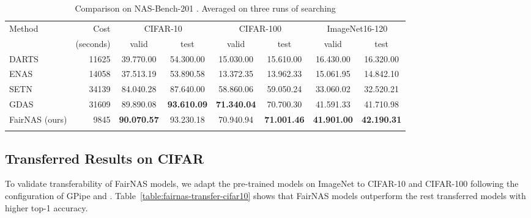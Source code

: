 \documentclass[10pt,twocolumn,letterpaper]{article}
\theoremstyle{definition}
\begin{document}
\begin{table*}[ht]
	\small
	\setlength{\tabcolsep}{2pt}
	\centering
\begin{tabular}{|l|r|*{6}{c|}}
\hline
Method	& Cost  & \multicolumn{2}{c|}{CIFAR-10}  & \multicolumn{2}{c|}{CIFAR-100}   &  \multicolumn{2}{c|}{ImageNet16-120}  \\
\cline{3-8}
  & (seconds) & valid & test & valid & test & valid & test \\
\hline
DARTS \cite{liu2018darts} & 11625& 39.770.00 & 54.300.00 & 15.030.00 & 15.610.00 & 16.430.00 & 16.320.00 \\
ENAS \cite{pham2018efficient} & 14058 & 37.513.19 & 53.890.58 & 13.372.35 & 13.962.33 & 15.061.95 & 14.842.10 \\
SETN \cite{dong2019one} & 34139& 84.040.28 & 87.640.00 & 58.860.06 & 59.050.24 & 33.060.02 & 32.520.21   \\ 
GDAS \cite{dong2019search} & 31609 & 89.890.08 & \textbf{93.610.09} & \textbf{71.340.04} & 70.700.30 & 41.591.33 & 41.710.98 \\
FairNAS (ours) & 9845 & \textbf{90.070.57} & 93.230.18 & 70.940.94 & \textbf{71.001.46} & \textbf{41.901.00} & \textbf{42.190.31} \\
\hline
\noalign{\smallskip}
\end{tabular}
	\caption{Comparison on NAS-Bench-201 \cite{dong2019bench}. Averaged on three runs of searching}
\label{tab:bench201}
\end{table*}

\subsection{Transferred Results on CIFAR}
To validate transferability of FairNAS models, we adapt the  pre-trained models on ImageNet  to CIFAR-10 and CIFAR-100 following the configuration of GPipe \cite{huang2018gpipe} and \cite{kornblith2019better}. Table~\ref{table:fairnas-transfer-cifar10} shows that FairNAS models outperform the rest transferred models with higher top-1 accuracy.
\end{document}
